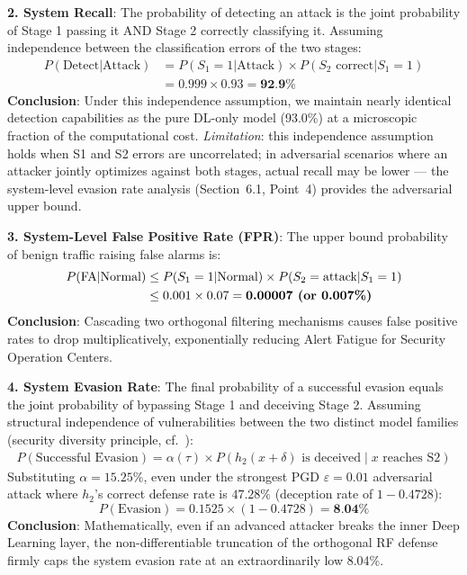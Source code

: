 \documentclass[sigconf]{acmart}
\begin{document}
\textbf{2. System Recall}: The probability of detecting an attack is the joint probability of Stage 1 passing it AND Stage 2 correctly classifying it. Assuming independence between the classification errors of the two stages:
\begin{align*}
P(\text{Detect}|\text{Attack}) &= P(S_1=1|\text{Attack}) \times P(S_2 \text{ correct}|S_1=1) \\
                               &= 0.999 \times 0.93 = \textbf{92.9\%}
\end{align*}
\textbf{Conclusion}: Under this independence assumption, we maintain nearly identical detection capabilities as the pure DL-only model (93.0\%) at a microscopic fraction of the computational cost. \emph{Limitation}: this independence assumption holds when S1 and S2 errors are uncorrelated; in adversarial scenarios where an attacker jointly optimizes against both stages, actual recall may be lower --- the system-level evasion rate analysis (Section~6.1, Point~4) provides the adversarial upper bound.

\textbf{3. System-Level False Positive Rate (FPR)}: The upper bound probability of benign traffic raising false alarms is:
\begin{align*}
P(\text{FA}|\text{Normal}) &\leq P(S_1=1|\text{Normal}) \times P(S_2=\text{attack}|S_1=1) \\
                           &\leq 0.001 \times 0.07 = \textbf{0.00007\ \text{(or 0.007\%)}}
\end{align*}
\textbf{Conclusion}: Cascading two orthogonal filtering mechanisms causes false positive rates to drop multiplicatively, exponentially reducing Alert Fatigue for Security Operation Centers.

\textbf{4. System Evasion Rate}: The final probability of a successful evasion equals the joint probability of bypassing Stage 1 and deceiving Stage 2. Assuming structural independence of vulnerabilities between the two distinct model families (security diversity principle, cf.\ \cite{15}):
\begin{align*}
P(\text{Successful Evasion}) = \alpha(\tau) \times P(h_2(x+\delta) \text{ is deceived} \mid x \text{ reaches S2})
\end{align*}
Substituting $\alpha=15.25\%$, even under the strongest PGD $\varepsilon=0.01$ adversarial attack where $h_2$'s correct defense rate is $47.28\%$ (deception rate of $1 - 0.4728$):
$$ P(\text{Evasion}) = 0.1525 \times (1 - 0.4728) = \textbf{8.04\%} $$
\textbf{Conclusion}: Mathematically, even if an advanced attacker breaks the inner Deep Learning layer, the non-differentiable truncation of the orthogonal RF defense firmly caps the system evasion rate at an extraordinarily low 8.04\%.
\end{document}
